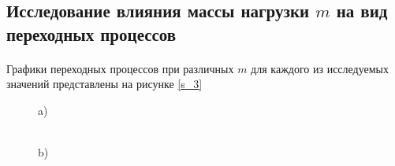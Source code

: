 \documentclass[a4paper,12pt]{article}
\begin{document}
	\clearpage
	\begin{center}
	\section{Исследование влияния массы нагрузки $m$ на вид переходных процессов}
	\end{center}
		
		
			\paragraph {} Графики переходных процессов при различных $m$ для каждого из исследуемых значений представлены на рисунке \ref{s_3}\\
		
		\begin{figure}[h!]
			\renewcommand{\figurename}{Рисунок}
			\begin{minipage}[h]{0.47\linewidth}
				 a) \\
			\end{minipage}
			\hfill
			\begin{minipage}[h]{0.47\linewidth}
				 \\b)

\end{minipage}
\end{figure}
\end{document}
